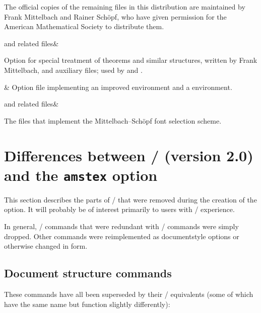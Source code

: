 The official copies of the remaining files in this distribution are maintained
by Frank Mittelbach and Rainer Sch\"opf, who have given permission for the
American Mathematical Society to distribute them.

\begin{filelist}
\newline
{}\newline and related files&

Option for special treatment of theorems and similar structures,
written by Frank Mittelbach, and auxiliary files; used by 
and .
\end{filelist}

\begin{filelist}
\newline {}&
Option file implementing an improved 
environment and a  environment.
\end{filelist}

\begin{filelist}
\newline
{}\newline
{}\newline
{}\newline
and related files&

The files that implement the Mittelbach--Sch\"opf
font selection scheme.
\end{filelist}


\section{Differences between \amstex/ (version 2.0)
and the {\tt amstex} option}
\label{s:diff}

This section describes the parts of \amstex/ that were removed
during the creation of the  option.  It will probably
be of interest primarily to users with \amstex/ experience.

In general, \amstex/ commands that were redundant with \latex/
commands were simply dropped.  Other commands were reimplemented
as documentstyle options or otherwise changed in form.

\subsection{Document structure commands}
These commands have all been
superseded by their \latex/ equivalents (some of which
have the same name but function slightly differently):


